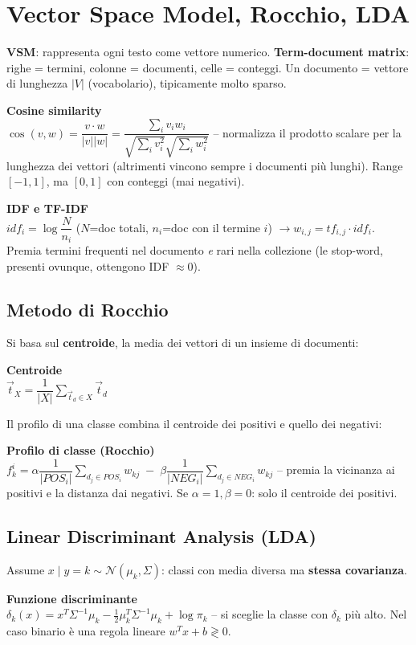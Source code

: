 \documentclass[11pt,a4paper]{article}
\newcommand{\formula}[2]{\begin{formulabox}\textbf{#1}\\[3pt]#2\end{formulabox}}
\begin{document}
\section{Vector Space Model, Rocchio, LDA}

\textbf{VSM}: rappresenta ogni testo come vettore numerico. \textbf{Term-document matrix}: righe = termini, colonne = documenti, celle = conteggi. Un documento = vettore di lunghezza $|V|$ (vocabolario), tipicamente molto sparso.

\formula{Cosine similarity}{$\cos(v,w) = \dfrac{v\cdot w}{|v||w|} = \dfrac{\sum_i v_i w_i}{\sqrt{\sum_i v_i^2}\sqrt{\sum_i w_i^2}}$ -- normalizza il prodotto scalare per la lunghezza dei vettori (altrimenti vincono sempre i documenti pi\`u lunghi). Range $[-1,1]$, ma $[0,1]$ con conteggi (mai negativi).}

\formula{IDF e TF-IDF}{$idf_i = \log\dfrac{N}{n_i}$ ($N$=doc totali, $n_i$=doc con il termine $i$) \quad$\to$\quad $w_{i,j} = tf_{i,j}\cdot idf_i$. Premia termini frequenti nel documento \emph{e} rari nella collezione (le stop-word, presenti ovunque, ottengono IDF $\approx 0$).}

\subsection*{Metodo di Rocchio}
Si basa sul \textbf{centroide}, la media dei vettori di un insieme di documenti:
\formula{Centroide}{$\vec{t}_X = \dfrac{1}{|X|}\sum_{\vec t_d \in X} \vec t_d$}
Il profilo di una classe combina il centroide dei positivi e quello dei negativi:
\formula{Profilo di classe (Rocchio)}{$f_k^i = \alpha\dfrac{1}{|POS_i|}\sum_{d_j\in POS_i} w_{kj} \;-\; \beta\dfrac{1}{|NEG_i|}\sum_{d_j\in NEG_i} w_{kj}$ -- premia la vicinanza ai positivi e la distanza dai negativi. Se $\alpha=1,\beta=0$: solo il centroide dei positivi.}

\subsection*{Linear Discriminant Analysis (LDA)}
Assume $x\mid y{=}k \sim \mathcal N(\mu_k,\Sigma)$: classi con media diversa ma \textbf{stessa covarianza}.
\formula{Funzione discriminante}{$\delta_k(x) = x^T\Sigma^{-1}\mu_k - \frac12 \mu_k^T\Sigma^{-1}\mu_k + \log\pi_k$ -- si sceglie la classe con $\delta_k$ pi\`u alto. Nel caso binario \`e una regola lineare $w^Tx+b \gtrless 0$.}
\end{document}
